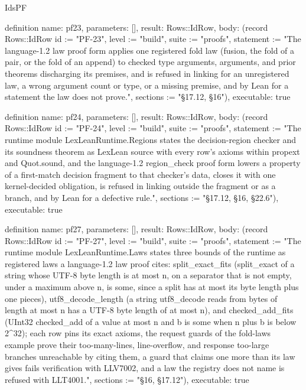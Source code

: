 \begin{lexlean}{IdsPF}
\begin{semanticmodule}
definition{
  name: pf23,
  parameters: [],
  result: Rows::IdRow,
  body: (record Rows::IdRow {id := "PF-23", level := "build", suite := "proofs", statement := "The language-1.2 law proof form applies one registered fold law (fusion, the fold of a pair, or the fold of an append) to checked type arguments, arguments, and prior theorems discharging its premises, and is refused in linking for an unregistered law, a wrong argument count or type, or a missing premise, and by Lean for a statement the law does not prove.", sections := "§17.12, §16"}),
  executable: true
}

definition{
  name: pf24,
  parameters: [],
  result: Rows::IdRow,
  body: (record Rows::IdRow {id := "PF-24", level := "build", suite := "proofs", statement := "The runtime module LexLeanRuntime.Regions states the decision-region checker and its soundness theorem as LexLean source with every row's axioms within propext and Quot.sound, and the language-1.2 region_check proof form lowers a property of a first-match decision fragment to that checker's data, closes it with one kernel-decided obligation, is refused in linking outside the fragment or as a branch, and by Lean for a defective rule.", sections := "§17.12, §16, §22.6"}),
  executable: true
}

definition{
  name: pf27,
  parameters: [],
  result: Rows::IdRow,
  body: (record Rows::IdRow {id := "PF-27", level := "build", suite := "proofs", statement := "The runtime module LexLeanRuntime.Laws states three bounds of the runtime as registered laws a language-1.2 law proof cites: split_exact_fits (split_exact of a string whose UTF-8 byte length is at most n, on a separator that is not empty, under a maximum above n, is some, since a split has at most its byte length plus one pieces), utf8_decode_length (a string utf8_decode reads from bytes of length at most n has a UTF-8 byte length of at most n), and checked_add_fits (UInt32 checked_add of a value at most n and b is some when n plus b is below 2^32); each row pins its exact axioms, the request guards of the fold-laws example prove their too-many-lines, line-overflow, and response too-large branches unreachable by citing them, a guard that claims one more than its law gives fails verification with LLV7002, and a law the registry does not name is refused with LLT4001.", sections := "§16, §17.12"}),
  executable: true
}
\end{semanticmodule}
\end{lexlean}
